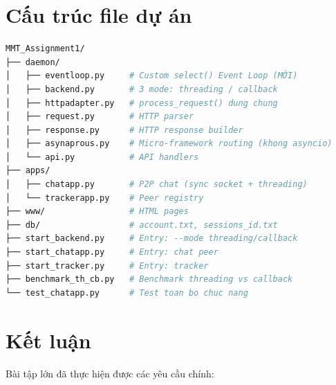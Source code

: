 \documentclass[12pt,a4paper]{article}
\begin{document}
\section{Cấu trúc file dự án}

\begin{lstlisting}[language=bash]
MMT_Assignment1/
├── daemon/
│   ├── eventloop.py     # Custom select() Event Loop (MỚI)
│   ├── backend.py       # 3 mode: threading / callback
│   ├── httpadapter.py   # process_request() dung chung
│   ├── request.py       # HTTP parser
│   ├── response.py      # HTTP response builder
│   ├── asynaprous.py    # Micro-framework routing (khong asyncio)
│   └── api.py           # API handlers
├── apps/
│   ├── chatapp.py       # P2P chat (sync socket + threading)
│   └── trackerapp.py    # Peer registry
├── www/                 # HTML pages
├── db/                  # account.txt, sessions_id.txt
├── start_backend.py     # Entry: --mode threading/callback
├── start_chatapp.py     # Entry: chat peer
├── start_tracker.py     # Entry: tracker
├── benchmark_th_cb.py   # Benchmark threading vs callback
└── test_chatapp.py      # Test toan bo chuc nang
\end{lstlisting}

\section{Kết luận}

Bài tập lớn đã thực hiện được các yêu cầu chính:
\end{document}
